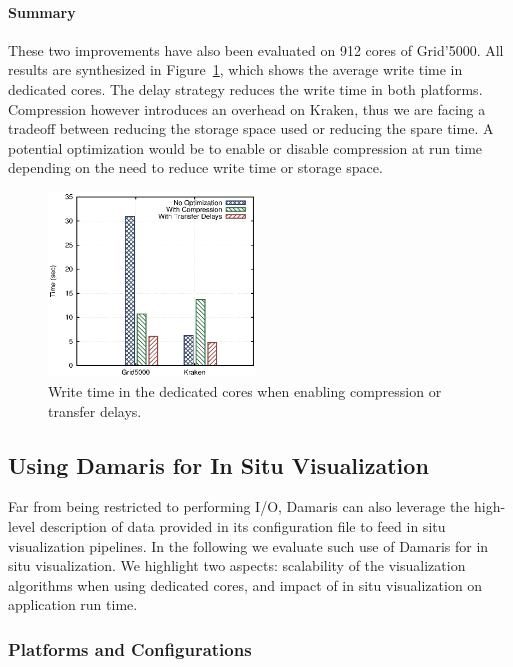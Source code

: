 \paragraph{Summary}
These two improvements have also been evaluated on 912 cores of Grid'5000.
All results are synthesized in Figure~\ref{fig:damaris-improvement},
which shows the average write time in dedicated cores.
The delay strategy reduces the write time in both platforms.
Compression however introduces an overhead on Kraken, thus we are 
facing a tradeoff between reducing the 
storage space used or reducing the spare time.
A potential optimization would be to enable or disable compression
at run time depending on the need to reduce write time or storage space.

\begin{figure}
	\includegraphics[width=5.5cm]{figures/gzip-scheduling-improvements.eps}
	\caption[Write time in Damaris using compression and transfer delays]{Write 
	time in the dedicated cores when enabling compression or transfer delays.} 
	\label{fig:damaris-improvement}
\end{figure}


\subsection{Using Damaris for In Situ Visualization}\label{sec:insitu}

Far from being restricted to performing I/O, Damaris can also leverage
the high-level description of data provided in its configuration file
to feed in situ visualization pipelines. In the following we evaluate
such use of Damaris for in situ visualization. We highlight two aspects: scalability
of the visualization algorithms when using dedicated cores, and impact
of in situ visualization on application run time.

\subsubsection{Platforms and Configurations}

